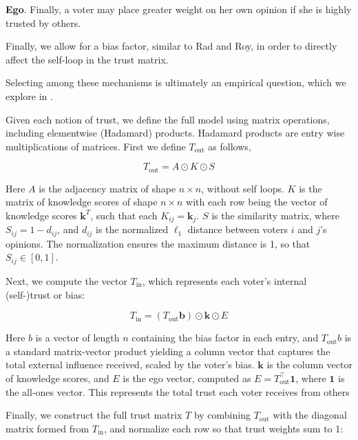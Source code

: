 \textbf{Ego}. Finally, a voter may place greater weight on her own opinion if
she is highly trusted by others.

Finally, we allow for a bias factor, similar to Rad and Roy, in order to
directly affect the self-loop in the trust matrix.

Selecting among these mechanisms is ultimately an empirical question, which we explore in .

Given each notion of trust, we define the full model using matrix operations,
including elementwise (Hadamard) products. Hadamard products are entry wise
multiplications of matrices. First we define $T_{\text{out}}$ as follows,

\begin{equation}
	T_{\text{out}} = A \odot  K \odot S
	\label{eq:mat_out_trust}
\end{equation}

Here $A$ is the adjacency matrix of shape $n \times n$, without self loops. $K$
is the matrix of knowledge scores of shape $n \times n$ with each row being
the vector of knowledge scores $\boldsymbol{k}^T$, such that each $K_{ij} =
	\boldsymbol{k}_j$. $S$ is the similarity matrix, where $S_{ij} = 1 - d_{ij}$,
and $d_{ij}$ is the normalized $\ell_1$ distance between voters $i$ and $j$’s
opinions. The normalization ensures the maximum distance is 1, so that $S_{ij}
	\in [0, 1]$.

Next, we compute the vector $T_{\text{in}}$, which represents each voter’s internal (self-)trust or bias:

\begin{equation}
	T_{\text{in}} = (T_{\text{out}} \boldsymbol{b}) \odot \boldsymbol{k} \odot E
	\label{eq:in_trust}
\end{equation}

Here $b$ is a vector of length $n$ containing the bias factor in each entry,
and $T_{\text{out}} b$ is a standard matrix-vector product yielding a column
vector that captures the total external influence received, scaled by the
voter's bias. $\boldsymbol{k}$ is the column vector of knowledge scores, and
$E$ is the ego vector, computed as $E = T_{\text{out}}^\top
	\boldsymbol{1}$, where $\boldsymbol{1}$ is the all-ones vector. This represents
the total trust each voter receives from others

Finally, we construct the full trust matrix $T$ by combining $T_{\text{out}}$ with the diagonal matrix formed from $T_{\text{in}}$, and normalize each row so that trust weights sum to 1:

